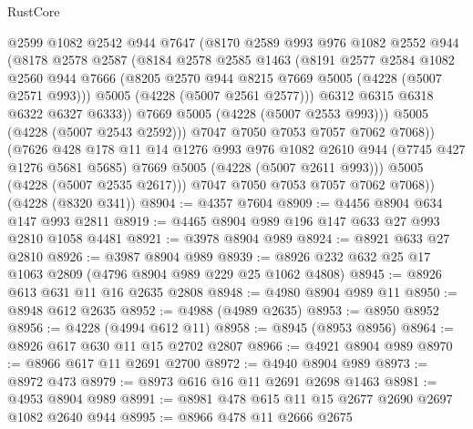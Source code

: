 \begin{lexlean}{RustCore}
\begin{coremodule}
                @2599
                @1082
                @2542
                @944
                @7647
                (@8170
                  @2589
                  @993
                  @976
                  @1082
                  @2552
                  @944
                  (@8178
                    @2578
                    @2587
                    (@8184
                      @2578
                      @2585
                      @1463
                      (@8191
                        @2577
                        @2584
                        @1082
                        @2560
                        @944
                        @7666
                        (@8205 @2570 @944 @8215 @7669 @5005 (@4228 (@5007 @2571 @993)))
                        @5005
                        (@4228 (@5007 @2561 @2577)))
                      @6312
                      @6315
                      @6318
                      @6322
                      @6327
                      @6333))
                  @7669
                  @5005
                  (@4228 (@5007 @2553 @993)))
                @5005
                (@4228 (@5007 @2543 @2592)))
              @7047
              @7050
              @7053
              @7057
              @7062
              @7068))
          (@7626
            @428
            @178
            @11
            @14
            @1276
            @993
            @976
            @1082
            @2610
            @944
            (@7745 @427 @1276 @5681 @5685)
            @7669
            @5005
            (@4228 (@5007 @2611 @993)))
          @5005
          (@4228 (@5007 @2535 @2617)))
        @7047
        @7050
        @7053
        @7057
        @7062
        @7068))
    (@4228 (@8320 @341))
@8904 := @4357 @7604
@8909 := @4456 @8904 @634 @147 @993 @2811
@8919 := @4465 @8904 @989 @196 @147 @633 @27 @993 @2810 @1058 @4481
@8921 := @3978 @8904 @989
@8924 := @8921 @633 @27 @2810
@8926 := @3987 @8904 @989
@8939 := @8926 @232 @632 @25 @17 @1063 @2809 (@4796 @8904 @989 @229 @25 @1062 @4808)
@8945 := @8926 @613 @631 @11 @16 @2635 @2808
@8948 := @4980 @8904 @989 @11
@8950 := @8948 @612 @2635
@8952 := @4988 (@4989 @2635)
@8953 := @8950 @8952
@8956 := @4228 (@4994 @612 @11)
@8958 := @8945 (@8953 @8956)
@8964 := @8926 @617 @630 @11 @15 @2702 @2807
@8966 := @4921 @8904 @989
@8970 := @8966 @617 @11 @2691 @2700
@8972 := @4940 @8904 @989
@8973 := @8972 @473
@8979 := @8973 @616 @16 @11 @2691 @2698 @1463
@8981 := @4953 @8904 @989
@8991 := @8981 @478 @615 @11 @15 @2677 @2690 @2697 @1082 @2640 @944
@8995 := @8966 @478 @11 @2666 @2675

\end{coremodule}
\end{lexlean}
